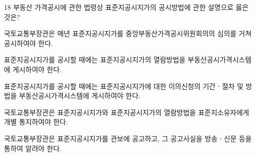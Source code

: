 \begin{question}{18}
부동산 가격공시에 관한 법령상 표준지공시지가의 공시방법에 관한 설명으로 옳은 것은?
\begin{choices}
  \item 국토교통부장관은 매년 표준지공시지가를 중앙부동산가격공시위원회의의 심의를 거쳐 공시하여야 한다. %
  \item 표준지공시지가를 공시할 때에는 표준지공시지가의 열람방법을 부동산공시가격시스템에 게시하여야 한다.
  \item 표준지공시지가를 공시할 때에는 표준지공시지가에 대한 이의신청의 기간ㆍ절차 및 방법을 부동산공시가격시스템에 게시하여야 한다.
  \item 국토교통부장관은 표준지공시지가와 표준지공시지가의 열람방법을 표준지소유자에게 개별 통지하여야 한다.
  \item 국토교통부장관은 표준지공시지가를 관보에 공고하고, 그 공고사실을 방송ㆍ신문 등을 통하여 알려야 한다.
\end{choices}
\end{question}
